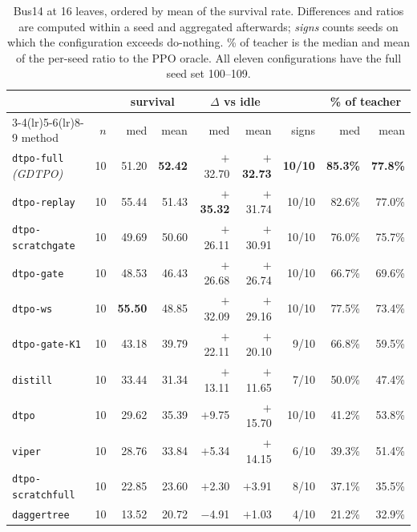 \begin{table}[H]
\centering
\footnotesize
\setlength{\tabcolsep}{4pt}
\begin{tabular}{lrrrrrrrr}
\toprule
& & \multicolumn{2}{c}{survival} & \multicolumn{2}{c}{$\Delta$ vs idle}
& & \multicolumn{2}{c}{\% of teacher} \\
\cmidrule(lr){3-4}\cmidrule(lr){5-6}\cmidrule(lr){8-9}
method & $n$ & med & mean & med & mean & signs & med & mean \\
\midrule
\texttt{dtpo-full} \emph{(GDTPO)} & 10 & 51.20 & \textbf{52.42} & $+$32.70 & \textbf{$+$32.73} & \textbf{10/10} & \textbf{85.3\%} & \textbf{77.8\%} \\
\texttt{dtpo-replay} & 10 & 55.44 & 51.43 & \textbf{$+$35.32} & $+$31.74 & 10/10 & 82.6\% & 77.0\% \\
\texttt{dtpo-scratchgate} & 10 & 49.69 & 50.60 & $+$26.11 & $+$30.91 & 10/10 & 76.0\% & 75.7\% \\
\texttt{dtpo-gate} & 10 & 48.53 & 46.43 & $+$26.68 & $+$26.74 & 10/10 & 66.7\% & 69.6\% \\
\texttt{dtpo-ws} & 10 & \textbf{55.50} & 48.85 & $+$32.09 & $+$29.16 & 10/10 & 77.5\% & 73.4\% \\
\texttt{dtpo-gate-K1} & 10 & 43.18 & 39.79 & $+$22.11 & $+$20.10 & 9/10 & 66.8\% & 59.5\% \\
\texttt{distill} & 10 & 33.44 & 31.34 & $+$13.11 & $+$11.65 & 7/10 & 50.0\% & 47.4\% \\
\texttt{dtpo} & 10 & 29.62 & 35.39 & $+$9.75 & $+$15.70 & 10/10 & 41.2\% & 53.8\% \\
\texttt{viper} & 10 & 28.76 & 33.84 & $+$5.34 & $+$14.15 & 6/10 & 39.3\% & 51.4\% \\
\texttt{dtpo-scratchfull} & 10 & 22.85 & 23.60 & $+$2.30 & $+$3.91 & 8/10 & 37.1\% & 35.5\% \\
\texttt{daggertree} & 10 & 13.52 & 20.72 & $-$4.91 & $+$1.03 & 4/10 & 21.2\% & 32.9\% \\
\bottomrule
\end{tabular}
\caption{Bus14 at 16 leaves, ordered by mean of the survival rate. Differences and ratios are computed within a seed and aggregated
afterwards; \emph{signs} counts seeds on which the configuration exceeds do-nothing.
\% of teacher is the median and mean of the per-seed ratio to the PPO oracle.
All eleven configurations have the full seed set 100--109.}
\label{tab:headline}
\end{table}

